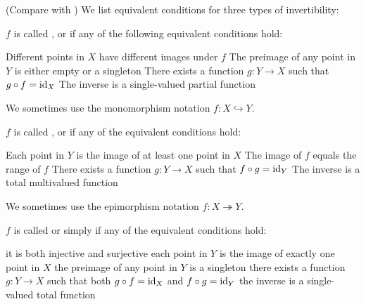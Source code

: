 \begin{definition}\label{def:function_invertibility}(Compare with )
  We list equivalent conditions for three types of invertibility:
  \begin{defenum}
     \( f \) is called ,  or  if any of the following equivalent conditions hold:
    \begin{defenum}
       Different points in \( X \) have different images under \( f \)
       The preimage of any point in \( Y \) is either empty or a singleton
       There exists a function \( g: Y \to X \) such that \( g \circ f = \operatorname{id}_X \)
       The inverse is a single-valued partial function
    \end{defenum}

    We sometimes use the monomorphism notation \( f: X \hookrightarrow Y \).

     \( f \) is called ,  or  if any of the equivalent conditions hold:
    \begin{defenum}
       Each point in \( Y \) is the image of at least one point in \( X \)
       The image of \( f \) equals the range of \( f \)
       There exists a function \( g: Y \to X \) such that \( f \circ g = \operatorname{id}_Y \)
       The inverse is a total multivalued function
    \end{defenum}

    We sometimes use the epimorphism notation \( f: X \twoheadrightarrow Y \).

     \( f \) is called  or simply  if any of the equivalent conditions hold:
    \begin{defenum}
       it is both injective and surjective
       each point in \( Y \) is the image of exactly one point in \( X \)
       the preimage of any point in \( Y \) is a singleton
       there exists a function \( g: Y \to X \) such that both \( g \circ f = \operatorname{id}_X \) and \( f \circ g = \operatorname{id}_Y \)
       the inverse is a single-valued total function
    \end{defenum}


\end{defenum}
\end{definition}
